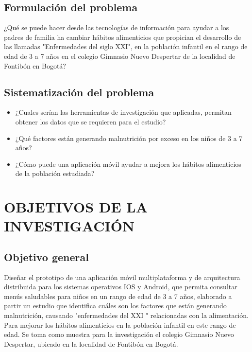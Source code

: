 \subsection{Formulación del problema}
¿Qué se puede hacer desde las tecnologías de información para ayudar a los padres de familia ha cambiar hábitos alimenticios que propician el desarrollo de las llamadas "Enfermedades del siglo XXI", en la población infantil en el rango de edad de 3 a 7 años en el colegio Gimnasio Nuevo Despertar de la localidad de Fontibón en Bogotá?
\subsection{Sistematización del problema}
\begin{itemize}
	\item ¿Cuales serían las herramientas de investigación que aplicadas, permitan obtener los datos que se requieren para el estudio?
	\item ¿Qué factores están generando malnutrición por exceso en los niños de 3 a 7 años?
	\item ¿Cómo puede una aplicación móvil ayudar a mejora los hábitos alimenticios de la población estudiada?
\end{itemize}
\newpage
\section{OBJETIVOS DE LA INVESTIGACIÓN}
\subsection{Objetivo general}
Diseñar el prototipo de una aplicación móvil multiplataforma y de arquitectura distribuida para los sistemas operativos IOS y Android, que permita consultar menús saludables para niños en un rango de edad de 3 a 7 años, elaborado a partir un estudio que identifica cuáles son los factores que están generando malnutrición, causando "enfermedades del XXI " relacionadas con la alimentación. Para mejorar los hábitos alimenticios en la población infantil en este rango de edad. Se toma como muestra para la investigación el colegio Gimnasio Nuevo Despertar, ubicado en la localidad de Fontibón en Bogotá.\\ 
